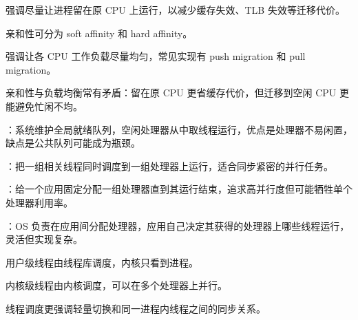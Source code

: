 \begin{points}
  \item {}强调尽量让进程留在原 CPU 上运行，以减少缓存失效、TLB 失效等迁移代价。
  \item 亲和性可分为 soft affinity 和 hard affinity。
  \item {}强调让各 CPU 工作负载尽量均匀，常见实现有 push migration 和 pull migration。
  \item 亲和性与负载均衡常有矛盾：留在原 CPU 更省缓存代价，但迁移到空闲 CPU 更能避免忙闲不均。
\end{points}


\begin{points}
  \item {}：系统维护全局就绪队列，空闲处理器从中取线程运行，优点是处理器不易闲置，缺点是公共队列可能成为瓶颈。
  \item {}：把一组相关线程同时调度到一组处理器上运行，适合同步紧密的并行任务。
  \item {}：给一个应用固定分配一组处理器直到其运行结束，追求高并行度但可能牺牲单个处理器利用率。
  \item {}：OS 负责在应用间分配处理器，应用自己决定其获得的处理器上哪些线程运行，灵活但实现复杂。
\end{points}


\begin{points}
  \item 用户级线程由线程库调度，内核只看到进程。
  \item 内核级线程由内核调度，可以在多个处理器上并行。
  \item 线程调度更强调轻量切换和同一进程内线程之间的同步关系。
\end{points}


